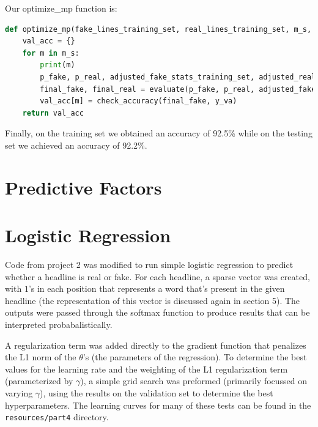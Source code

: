 \documentclass{article}
\begin{document}
Our optimize\_mp function is:
\begin{lstlisting}[language=Python]
def optimize_mp(fake_lines_training_set, real_lines_training_set, m_s, mp):
    val_acc = {}
    for m in m_s:
        print(m)
        p_fake, p_real, adjusted_fake_stats_training_set, adjusted_real_stats_training_set = training_part(fake_lines_training_set, real_lines_training_set, m, mp)
        final_fake, final_real = evaluate(p_fake, p_real, adjusted_fake_stats_training_set, adjusted_real_stats_training_set, validation_set)
        val_acc[m] = check_accuracy(final_fake, y_va)
    return val_acc

  \end{lstlisting}

Finally, on the training set we obtained an accuracy of 92.5\% while on the testing set we achieved an accuracy of 92.2\%.


   \section{Predictive Factors}




   \section{Logistic Regression}
   Code from project 2 was modified to run simple logistic regression to predict whether a headline is real
   or fake. For each headline, a sparse vector was created, with $1$'s in each position that represents a word
   that's present in the given headline (the representation of this vector is discussed again in section 5).
   The outputs were passed through the softmax function to produce results that can be interpreted probabalistically.

   A regularization term was added directly to the gradient function that penalizes the L1 norm of the
   $\theta$'s (the parameters of the regression).
   To determine the best values for the learning rate and the weighting of the L1 regularization term (parameterized
   by $\gamma$), a simple grid search was preformed (primarily focussed on varying $\gamma$), using the results on
   the validation set to determine the best hyperparameters. The learning curves for many of these tests can be
   found in the \texttt{resources/part4} directory.
\end{document}
